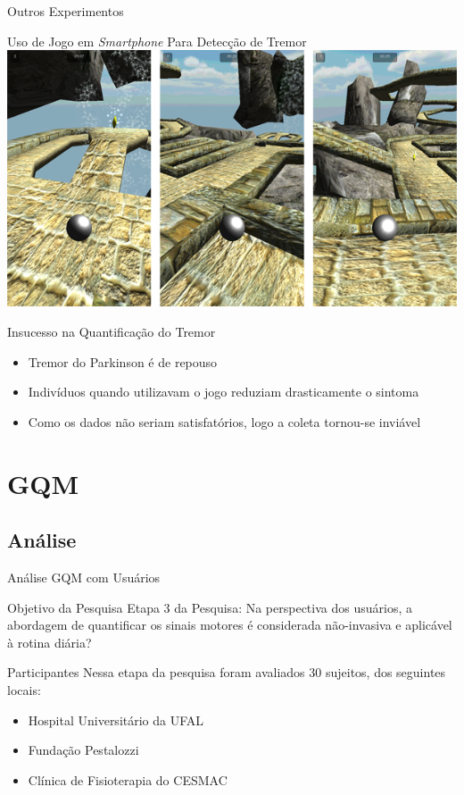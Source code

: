 \documentclass{beamer}
\begin{document}
\begin{frame}{Outros Experimentos}
	\begin{block}{Uso de Jogo em \textit{Smartphone} Para Detecção de Tremor}
	\center \includegraphics[height=1 in]{img/pinball_world.png}
	\end{block}
	\begin{block}{Insucesso na Quantificação do Tremor}
			\begin{itemize}
			\item Tremor do Parkinson é de repouso
			\item Indivíduos quando utilizavam o jogo reduziam drasticamente o sintoma
			\item Como os dados não seriam satisfatórios, logo a coleta tornou-se inviável
		\end{itemize}
	\end{block}
\end{frame}






\section{GQM}
\subsection{Análise}
\begin{frame}{Análise GQM com Usuários} 
    \begin{block}{Objetivo da Pesquisa}
      Etapa 3 da Pesquisa: Na perspectiva dos usuários, a abordagem de quantificar os sinais motores é considerada não-invasiva e aplicável à rotina diária?
    \end{block}
		\begin{block}{Participantes}
		Nessa etapa da pesquisa foram avaliados 30 sujeitos, dos seguintes locais: 
			\begin{itemize}
				\item Hospital Universitário da UFAL
				\item Fundação Pestalozzi
				\item Clínica de Fisioterapia do CESMAC
			\end{itemize}
    \end{block}
\end{frame} 
\end{document}
